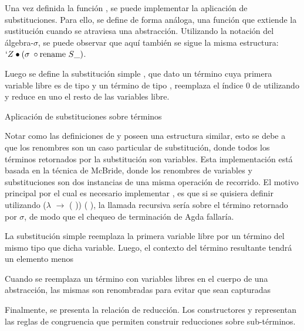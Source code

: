 Una vez definida la función , se puede implementar la aplicación de substituciones.
Para ello, se define de forma análoga, una función  que extiende la sustitución cuando se atraviesa una abstracción.
Utilizando la notación del álgebra-$\sigma$, se puede observar que aquí también se sigue la misma estructura: $`Z \bullet (\sigma \; \circ \text{rename } S\_)$.

Luego se define la substitución simple \func{$\_[\_]$}, que dato un término  cuya primera variable libre es de tipo  y un término  de tipo , reemplaza el índice 0 de  utilizando  y reduce en uno el resto de las variables libre.

\begin{codigo}
	Aplicación de substituciones sobre términos
\end{codigo}

Notar como las definiciones de  y  poseen una estructura similar, esto se debe a que los renombres son un caso particular de substitución, donde todos los términos retornados por la substitución son variables.
Esta implementación está basada en la técnica de McBride\cite{ren-sub}, donde los renombres de variables y substituciones son dos instancias de una misma operación de recorrido.
El motivo principal por el cual es necesario implementar , es que si se quisiera definir  utilizando  ($\lambda$  $\rightarrow$  ( )) (\bound{$\sigma$} ), la llamada recursiva sería sobre el término retornado por $\sigma$, de modo que el chequeo de terminación de Agda fallaría.

\begin{example}
	La substitución simple reemplaza la primera variable libre por un término del mismo tipo que dicha variable.
	Luego, el contexto del término resultante tendrá un elemento menos
\end{example}
\begin{example}
	Cuando se reemplaza un término con variables libres en el cuerpo de una abstracción, las mismas son renombradas para evitar que sean capturadas
\end{example}

Finalmente, se presenta la relación de reducción.
Los constructores \const{$\xi$} y \const{$\zeta$} representan las reglas de congruencia que permiten construir reducciones sobre sub-términos.

